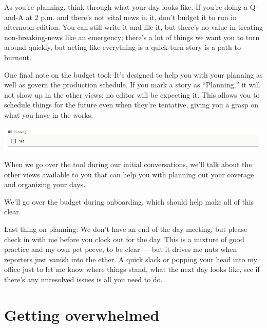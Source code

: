 \documentclass[
  11pt,
  american,
  letterpaperpaper,
  extrafontsizes,onecolumn,openright
  ]{memoir}
\begin{document}
As you're planning, think through what your day looks like. If you're doing a Q-and-A at 2 p.m. and there's not vital news in it, don't budget it to run in afternoon edition. You can still write it and file it, but there's no value in treating non-breaking-news like an emergency; there's a lot of things we want you to turn around quickly, but acting like everything is a quick-turn story is a path to burnout.

One final note on the budget tool: It's designed to help you with your planning as well as govern the production schedule. If you mark a story as \enquote{Planning,} it will not show up in the other views; no editor will be expecting it. This allows you to schedule things for the future even when they're tentative, giving you a grasp on what you have in the works.

\scriptsize

\begin{center}\includegraphics[width=0.8\linewidth]{images/planning-new} \end{center}

\normalsize

When we go over the tool during our initial conversations, we'll talk about the other views available to you that can help you with planning out your coverage and organizing your days.

\leavevmode{}%
\begin{greybox}[frametitle=Onboarding Path]
We'll go over the budget during onboarding, which should help make all of this clear.

\end{greybox}

Last thing on planning: We don't have an end of the day meeting, but please check in with me before you clock out for the day. This is a mixture of good practice and my own pet peeve, to be clear --- but it drives me nuts when reporters just vanish into the ether. A quick slack or popping your head into my office just to let me know where things stand, what the next day looks like, see if there's any unresolved issues is all you need to do.

\hypertarget{getting-overwhelmed}{%
\section*{Getting overwhelmed}\label{getting-overwhelmed}}
\end{document}
